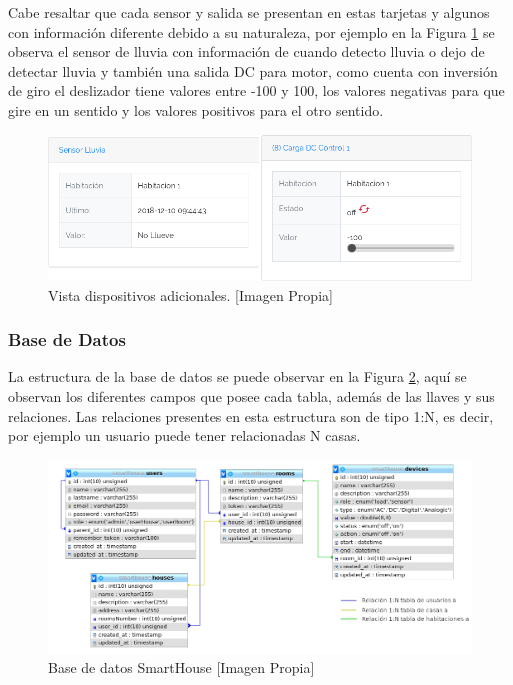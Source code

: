 Cabe resaltar que cada sensor y salida se presentan en estas tarjetas y algunos con información diferente debido a su naturaleza, por ejemplo en la Figura \ref{fig:r_app1} se observa el sensor de lluvia con información de cuando detecto lluvia o dejo de detectar lluvia y también una salida DC para motor, como cuenta con inversión de giro el deslizador tiene valores entre -100 y 100, los valores negativas para que gire en un sentido y los valores positivos para el otro sentido.

\begin{figure}[!t]
	\centering
	\caption[Vista dispositivos adicionales.]{Vista dispositivos adicionales. [Imagen Propia]}
	\label{fig:r_app1}
	\includegraphics[width=\linewidth]{Imagenes/R_app1}
\end{figure}

\subsubsection*{Base de Datos}

La estructura de la base de datos se puede observar en la Figura \ref{fig:db}, aquí se observan los diferentes campos que posee cada tabla, además de las llaves y sus relaciones. Las relaciones presentes en esta estructura son de tipo 1:N, es decir, por ejemplo un usuario puede tener relacionadas N casas.\\

\begin{figure}[!t]
	\centering
	\caption{Base de datos SmartHouse [Imagen Propia]}
	\label{fig:db}
	\includegraphics[width=0.75\linewidth]{Imagenes/DB}
\end{figure}

